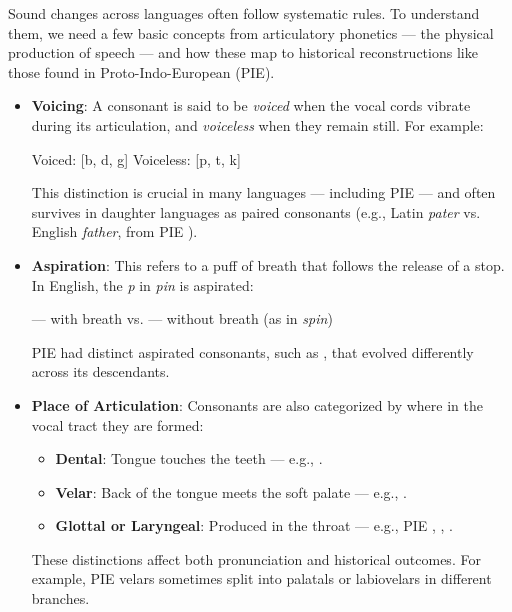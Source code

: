 \begin{tcolorbox}[
  colback=gray!5,
  colframe=black!60,
  title={\textbf{How Consonants Change: Voicing, Aspiration, and Place}},
  sharp corners,
  boxrule=0.4pt,
  fonttitle=\bfseries,
  left=6pt, right=6pt, top=4pt, bottom=4pt,
  enhanced,
  before skip=10pt, after skip=10pt
]

Sound changes across languages often follow systematic rules. To understand them, we need a few basic concepts from articulatory phonetics — the physical production of speech — and how these map to historical reconstructions like those found in Proto-Indo-European (PIE).

\medskip

\begin{itemize}[leftmargin=*]

\item \textbf{Voicing}: A consonant is said to be \emph{voiced} when the vocal cords vibrate during its articulation, and \emph{voiceless} when they remain still. For example:
\begin{center}
  {\ipafont Voiced: [b, d, g] \quad\quad Voiceless: [p, t, k]}
\end{center}
This distinction is crucial in many languages — including PIE — and often survives in daughter languages as paired consonants (e.g., Latin \emph{pater} vs. English \emph{father}, from PIE ).

\item \textbf{Aspiration}: This refers to a puff of breath that follows the release of a stop. In English, the \emph{p} in \emph{pin} is aspirated:
\begin{center}
  {\ipafont [pʰ]} — with breath \quad vs. \quad [p] — without breath (as in \emph{spin})
\end{center}
PIE had distinct aspirated consonants, such as , that evolved differently across its descendants.

\item \textbf{Place of Articulation}: Consonants are also categorized by where in the vocal tract they are formed:
  \begin{itemize}
    \item \textbf{Dental}: Tongue touches the teeth — e.g., {\ipafont [t, d]}.
    \item \textbf{Velar}: Back of the tongue meets the soft palate — e.g., {\ipafont [k, g]}.
    \item \textbf{Glottal or Laryngeal}: Produced in the throat — e.g., PIE , , .
  \end{itemize}
These distinctions affect both pronunciation and historical outcomes. For example, PIE velars sometimes split into palatals or labiovelars in different branches.


\end{itemize}
\end{tcolorbox}
